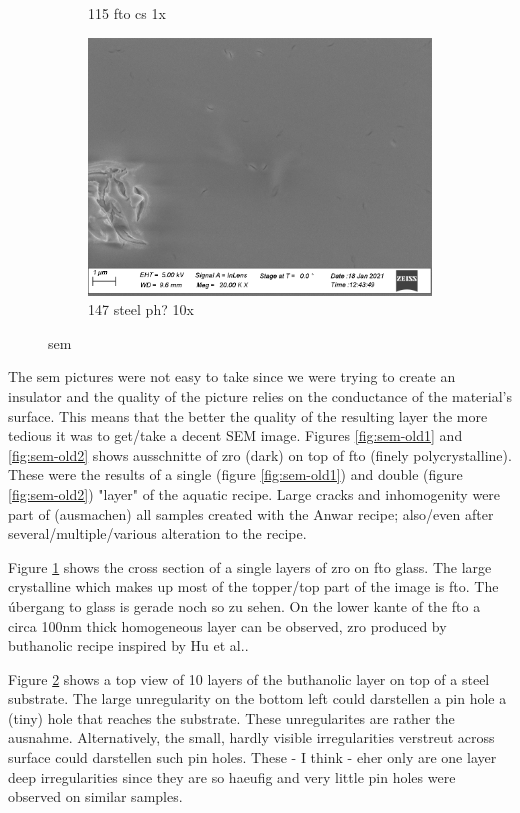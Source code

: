 \begin{figure}
\begin{subfigure}{.45\textwidth}
        \caption{115 fto cs 1x} \label{fig:sem-cs1}
    \end{subfigure}
    \begin{subfigure}{.45\textwidth}
        \centering
        \includegraphics[width=.8\textwidth]{Pics/sem/147_steel_ph_10x.png}
        \caption{147 steel ph? 10x} \label{fig:sem-ph}
    \end{subfigure}
    \caption{sem}
    \label{fig:sem}
\end{figure}

The \gls{sem} pictures were not easy to take since we were trying to create an insulator 
and the quality of the picture relies on the conductance of the material's surface. 
This means that the better the quality of the resulting layer the more tedious it was to get/take a decent SEM image. 
Figures \ref{fig:sem-old1} and \ref{fig:sem-old2} shows ausschnitte of \gls{zro} (dark) on top of \gls{fto} (finely polycrystalline). 
These were the results of a single (figure \ref{fig:sem-old1}) and double (figure \ref{fig:sem-old2}) "layer" of the aquatic recipe. 
Large cracks and inhomogenity were part of (ausmachen) all samples created with the Anwar recipe; 
also/even after several/multiple/various alteration to the recipe. 

Figure \ref{fig:sem-cs1} shows the cross section of a single layers of \gls{zro} on \gls{fto} glass. 
The large crystalline  which makes up most of the topper/top part of the image is \gls{fto}. 
The úbergang to glass is gerade noch so zu sehen. 
On the lower kante of the \gls{fto} a circa 100nm thick homogeneous layer can be observed, \gls{zro} produced by buthanolic recipe inspired by Hu et al..

Figure \ref{fig:sem-ph} shows a top view of 10 layers of the buthanolic layer on top of a steel substrate. 
The large unregularity on the bottom left could darstellen a pin hole a (tiny) hole that reaches the substrate. 
These unregularites are rather the ausnahme. 
Alternatively, the small, hardly visible  irregularities verstreut across surface could darstellen such pin holes. 
These - I think - eher only are one layer deep irregularities since they are so haeufig 
and very little pin holes were observed on similar samples. 



